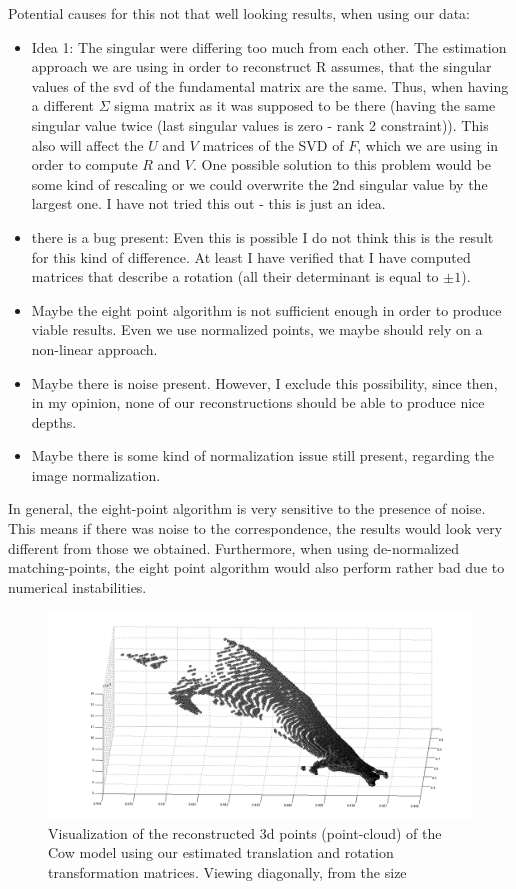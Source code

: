 \documentclass{paper}
\begin{document}
Potential causes for this not that well looking results, when using our data:
\begin{itemize}
    \item Idea 1: The singular were differing too much from each other. The estimation approach we are using in order to reconstruct R assumes, that the singular values of the svd of the fundamental matrix are the same. Thus, when having a different $\Sigma$ sigma matrix as it was supposed to be there (having the same singular value twice (last singular values is zero - rank 2 constraint)). This also will affect the $U$ and $V$ matrices of the SVD of $F$, which we are using in order to compute $R$ and $V$. One possible solution to this problem would be some kind of rescaling or we could overwrite the 2nd singular value by the largest one. I have not tried this out - this is just an idea.
    \item there is a bug present: Even this is possible I do not think this is the result for this kind of difference. At least I have verified that I have computed matrices that describe a rotation (all their determinant is equal to $\pm 1$).
    \item Maybe the eight point algorithm is not sufficient enough in order to produce viable results. Even we use normalized points, we maybe should rely on a non-linear approach.
    \item Maybe there is noise present. However, I exclude this possibility, since then, in my opinion, none of our reconstructions should be able to produce nice depths.
    \item Maybe there is some kind of normalization issue still present, regarding the image normalization.
\end{itemize}

In general, the eight-point algorithm is very sensitive to the presence of noise. This means if there was noise to the correspondence, the results would look very different from those we obtained. Furthermore, when using de-normalized matching-points, the eight point algorithm would also perform rather bad due to numerical instabilities.

\begin{figure}[H]
\centering
\includegraphics[width=\textwidth]{figures/rec_esti_1}
\caption{Visualization of the reconstructed 3d points (point-cloud) of the Cow model using our estimated translation and rotation transformation matrices. Viewing diagonally, from the size}
\label{fig:cow_rec_us_1}
\end{figure}
\end{document}
